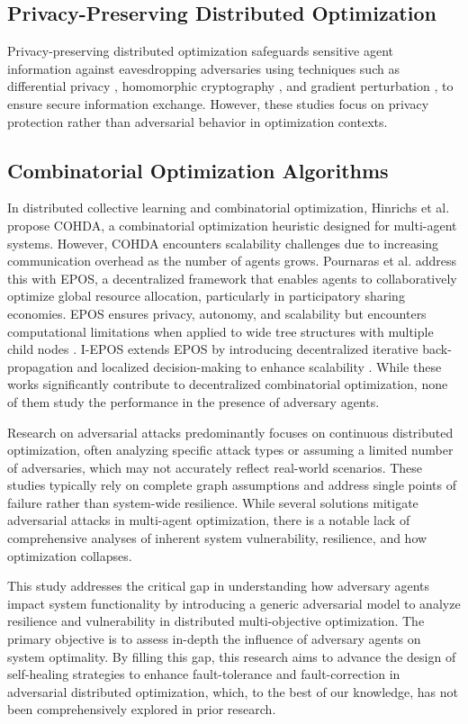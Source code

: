 \subsection{Privacy-Preserving Distributed Optimization}
Privacy-preserving distributed optimization safeguards sensitive agent information against eavesdropping adversaries using techniques such as differential privacy \cite{ding2018consensus, ding2021differentially}, homomorphic cryptography \cite{zhang2018enabling, lu2018privacy}, and gradient perturbation \cite{mao2020privacy, chen2023differentially}, to ensure secure information exchange. However, these studies focus on privacy protection rather than adversarial behavior in optimization contexts.

\subsection{Combinatorial Optimization Algorithms}
In distributed collective learning and combinatorial optimization, Hinrichs et al. \cite{hinrichs2014cohda, hinrichs2017distributed} propose COHDA, a combinatorial optimization heuristic designed for multi-agent systems. However, COHDA encounters scalability challenges due to increasing communication overhead as the number of agents grows. Pournaras et al. \cite{pournaras2017self} address this with EPOS,
a decentralized framework that enables agents to collaboratively optimize global resource allocation, particularly in participatory sharing economies. EPOS ensures privacy, autonomy, and scalability but encounters computational limitations when applied to wide tree structures with multiple child nodes \cite{pournaras2018decentralized}. I-EPOS extends EPOS by introducing decentralized iterative back-propagation and localized decision-making to enhance scalability \cite{pournaras2020collective, pournaras2018decentralized}. While these works significantly contribute to decentralized combinatorial optimization, none of them study the performance in the presence of adversary agents.

Research on adversarial attacks predominantly focuses on continuous distributed optimization, often analyzing specific attack types or assuming a limited number of adversaries, which may not accurately reflect real-world scenarios. These studies typically rely on complete graph assumptions and address single points of failure rather than system-wide resilience. While several solutions mitigate adversarial attacks in multi-agent optimization, there is a notable lack of comprehensive analyses of inherent system vulnerability, resilience, and how optimization collapses.

This study addresses the critical gap in understanding how adversary agents impact system functionality by introducing a generic adversarial model to analyze resilience and vulnerability in distributed multi-objective optimization. The primary objective is to assess in-depth the influence of adversary agents on system optimality. By filling this gap, this research aims to advance the design of self-healing strategies to enhance fault-tolerance and fault-correction in adversarial distributed optimization, which, to the best of our knowledge, has not been comprehensively explored in prior research.